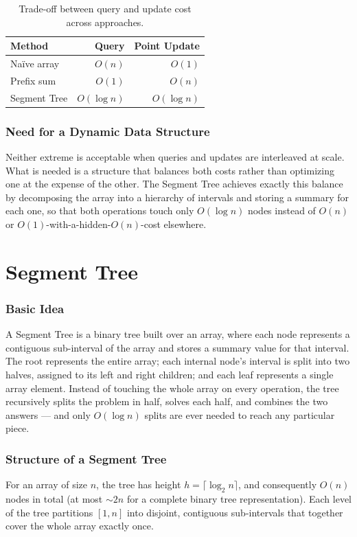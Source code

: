 \documentclass[11pt,open=any]{scrreprt}
\begin{document}
\begin{table}[h]
\centering
\caption{Trade-off between query and update cost across approaches.}
\label{tab:tradeoff}
\begin{tabular}{lrr}
\toprule
\textbf{Method} & \textbf{Query} & \textbf{Point Update} \\
\midrule
Na\"ive array  & $O(n)$      & $O(1)$ \\
Prefix sum     & $O(1)$      & $O(n)$ \\
Segment Tree   & $O(\log n)$ & $O(\log n)$ \\
\bottomrule
\end{tabular}
\end{table}

\subsection{Need for a Dynamic Data Structure}
Neither extreme is acceptable when queries and updates are interleaved at scale. What is needed is a structure that balances both costs rather than optimizing one at the expense of the other. The Segment Tree achieves exactly this balance by decomposing the array into a hierarchy of intervals and storing a summary for each one, so that both operations touch only $O(\log n)$ nodes instead of $O(n)$ or $O(1)$-with-a-hidden-$O(n)$-cost elsewhere.

\chapter{Segment Tree}

\subsection{Basic Idea}
A Segment Tree is a binary tree built over an array, where each node represents a contiguous sub-interval of the array and stores a summary value for that interval. The root represents the entire array; each internal node's interval is split into two halves, assigned to its left and right children; and each leaf represents a single array element. Instead of touching the whole array on every operation, the tree recursively splits the problem in half, solves each half, and combines the two answers --- and only $O(\log n)$ splits are ever needed to reach any particular piece.

\subsection{Structure of a Segment Tree}
For an array of size $n$, the tree has height $h = \lceil \log_2 n \rceil$, and consequently $O(n)$ nodes in total (at most $\sim\!2n$ for a complete binary tree representation). Each level of the tree partitions $[1,n]$ into disjoint, contiguous sub-intervals that together cover the whole array exactly once.
\end{document}
